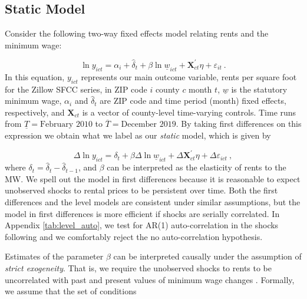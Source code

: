 \subsection{Static Model}
Consider the following two-way fixed effects model relating rents and the minimum wage:

\begin{equation*} \label{eq:did_lev}
    \ln y_{ict} = \alpha_i + \hat{\delta}_t 
    			+ \beta \ln \underline{w}_{ict}
    			+ \mathbf{X}^{'}_{ct}\eta
    			+ \varepsilon_{it} \ .
\end{equation*}    
In this equation, $y_{ict}$ represents our main outcome variable, rents per square foot 
for the Zillow SFCC series, in ZIP code $i$ county $c$ month $t$, $\underline{w}$ is the 
statutory minimum wage, $\alpha_i$ and $\hat{\delta}_t$ are ZIP code and time period 
(month) fixed effects, respectively, and $\mathbf{X}_{ct}$ is a vector of county-level 
time-varying controls. Time runs from $\underline{T} = \text{February 2010}$ to 
$\overline{T} = \text{December 2019}$. By taking first differences on this expression 
we obtain what we label as our \textit{static} model, which is given by

\begin{equation}\label{eq:did}
	\Delta \ln y_{ict} = \delta_t
						+ \beta \Delta \ln \underline{w}_{ict}
						+ \Delta \mathbf{X}^{'}_{ct} \eta
						+ \Delta \varepsilon_{ict} \ ,
\end{equation}
where $\delta_t = \hat{\delta}_t - \hat{\delta}_{t-1}$, and $\beta$ can be interpreted 
as the elasticity of rents to the MW. We spell out the model in first differences because 
it is reasonable to expect unobserved shocks to rental prices to be persistent over 
time. Both the first differences and the level models are consistent under similar 
assumptions, but the model in first differences is more efficient if shocks are serially 
correlated. In Appendix \ref{tab:level_auto}, we test for AR(1) auto-correlation in 
the shocks following \textcite[][chapter 10]{wooldridge2010} and we comfortably reject 
the no auto-correlation hypothesis. 

Estimates of the parameter $\beta$ can be interpreted causally under the assumption of
\textit{strict exogeneity}. That is, we require the unobserved shocks to rents to be 
uncorrelated with past and present values of minimum wage changes 
\parencite[][chapter 10]{wooldridge2010}. Formally, we assume that the set of conditions

